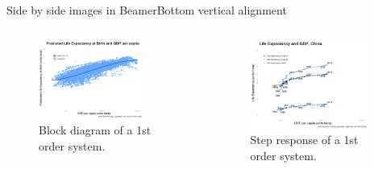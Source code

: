 \begin{frame}{Side by side images in Beamer}{Bottom vertical alignment}
\begin{columns}[c]
    \begin{column}{.5\textwidth}
    \begin{figure}
        \centering
        \includegraphics[width=0.8\textwidth]{figures/ECON-412/gdp_pc_le_predictions.png}
        \caption{Block diagram of a 1st order system.}
    \end{figure}      
    \end{column}
    \begin{column}{.5\textwidth}
    \begin{figure}
        \centering
        \includegraphics[width=0.9\textwidth]{figures/ECON-412/gdp_pc_le_China.png}
        \caption{Step response of a 1st order system.}
    \end{figure}
    \end{column}
\end{columns}
\end{frame}


